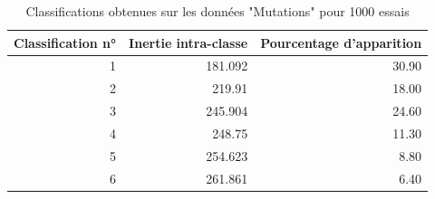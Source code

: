 \documentclass[a4paper,10pt]{report}
\begin{document}
\begin{table}[H]
	\centering
	\captionsetup{justification=centering, margin=3cm}
	\begin{tabular}{r|r|r}
		Classification n° & Inertie intra-classe & Pourcentage d'apparition \\
		\hline
		1 & 181.092 & 30.90 \\ 
		2 & 219.91 & 18.00 \\ 
		3 & 245.904 & 24.60 \\ 
		4 & 248.75 & 11.30 \\ 
		5 & 254.623 & 8.80 \\ 
		6 & 261.861 & 6.40 \\ 
	\end{tabular}
	\caption{Classifications obtenues sur les données "Mutations" pour 1000 essais}
\end{table}
\end{document}
